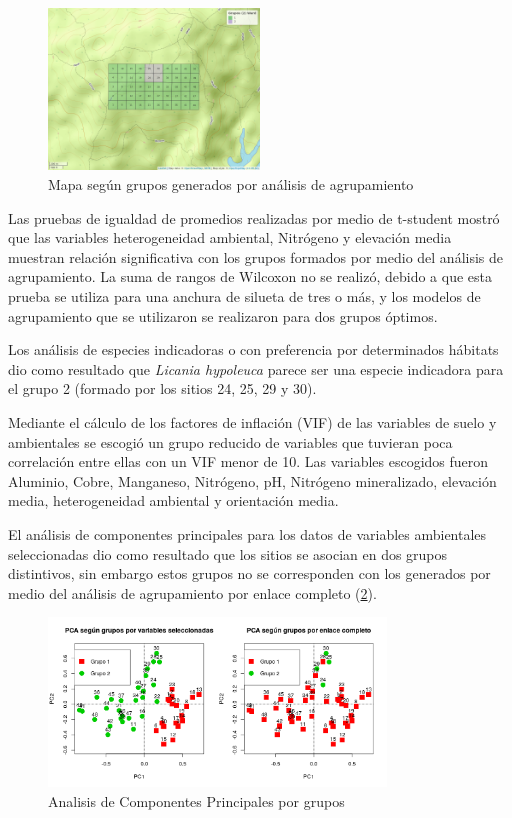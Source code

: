 \documentclass[11pt,]{article}
\begin{document}
\begin{figure}
\centering
\includegraphics[width=0.50000\textwidth]{mapa_ward_k2.png}
\caption{Mapa según grupos generados por análisis de
agrupamiento\label{mapagrupos}}
\end{figure}

Las pruebas de igualdad de promedios realizadas por medio de t-student
mostró que las variables heterogeneidad ambiental, Nitrógeno y elevación
media muestran relación significativa con los grupos formados por medio
del análisis de agrupamiento. La suma de rangos de Wilcoxon no se
realizó, debido a que esta prueba se utiliza para una anchura de silueta
de tres o más, y los modelos de agrupamiento que se utilizaron se
realizaron para dos grupos óptimos.

Los análisis de especies indicadoras o con preferencia por determinados
hábitats dio como resultado que \emph{Licania hypoleuca} parece ser una
especie indicadora para el grupo 2 (formado por los sitios 24, 25, 29 y
30).

Mediante el cálculo de los factores de inflación (VIF) de las variables
de suelo y ambientales se escogió un grupo reducido de variables que
tuvieran poca correlación entre ellas con un VIF menor de 10. Las
variables escogidos fueron Aluminio, Cobre, Manganeso, Nitrógeno, pH,
Nitrógeno mineralizado, elevación media, heterogeneidad ambiental y
orientación media.

El análisis de componentes principales para los datos de variables
ambientales seleccionadas dio como resultado que los sitios se asocian
en dos grupos distintivos, sin embargo estos grupos no se corresponden
con los generados por medio del análisis de agrupamiento por enlace
completo (\ref{pcagroup}).

\begin{figure}
\centering
\includegraphics[width=0.80000\textwidth]{PCA_porgrupos.png}
\caption{Analisis de Componentes Principales por grupos\label{pcagroup}}
\end{figure}
\end{document}
